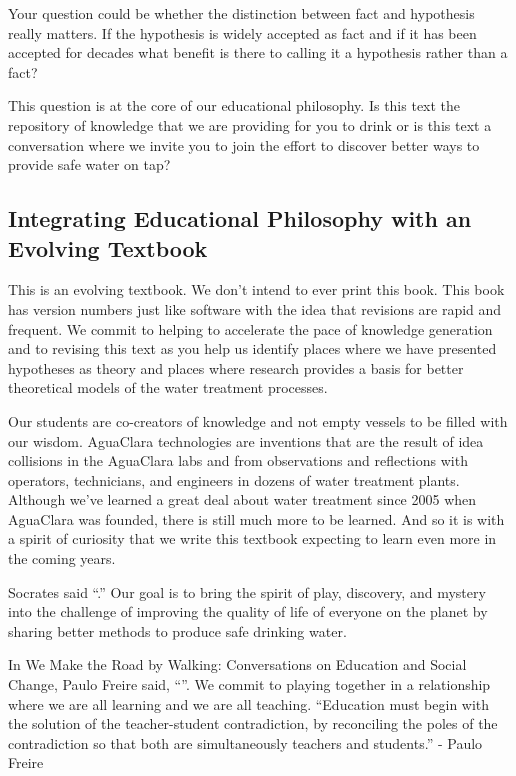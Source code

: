 \documentclass[letterpaper,10pt,english]{sphinxmanual}
\begin{document}
Your question could be whether the distinction between fact and hypothesis really matters. If the hypothesis is widely accepted as fact and if it has been accepted for decades what benefit is there to calling it a hypothesis rather than a fact?

This question is at the core of our educational philosophy. Is this text the repository of knowledge that we are providing for you to drink or is this text a conversation where we invite you to join the effort to discover better ways to provide safe water on tap?


\subsection{Integrating Educational Philosophy with an Evolving Textbook}
\label{\detokenize{Introduction/Introduction:integrating-educational-philosophy-with-an-evolving-textbook}}\label{\detokenize{Introduction/Introduction:heading-textbook-philosophy}}
This is an evolving textbook. We don’t intend to ever print this book. This book has version numbers just like software with the idea that revisions are rapid and frequent. We commit to helping to accelerate the pace of knowledge generation and to revising this text as you help us identify places where we have presented hypotheses as theory and places where research provides a basis for better theoretical models of the water treatment processes.

Our students are co-creators of knowledge and not empty vessels to be filled with our wisdom. AguaClara technologies are inventions that are the result of idea collisions in the AguaClara labs and from observations and reflections with operators, technicians, and engineers in dozens of water treatment plants. Although we’ve learned a great deal about water treatment since 2005 when AguaClara was founded, there is still much more to be learned. And so it is with a spirit of curiosity that we write this textbook expecting to learn even more in the coming years.

Socrates said “.” Our goal is to bring the spirit of play, discovery, and mystery into the challenge of improving the quality of life of everyone on the planet by sharing better methods to produce safe drinking water.

In We Make the Road by Walking: Conversations on Education and Social Change, Paulo Freire said,
“”. We commit to playing together in a relationship where we are all learning and we are all teaching. “Education must begin with the solution of the teacher-student contradiction, by reconciling the poles of the contradiction so that both are simultaneously teachers and students.” - Paulo Freire
\end{document}
